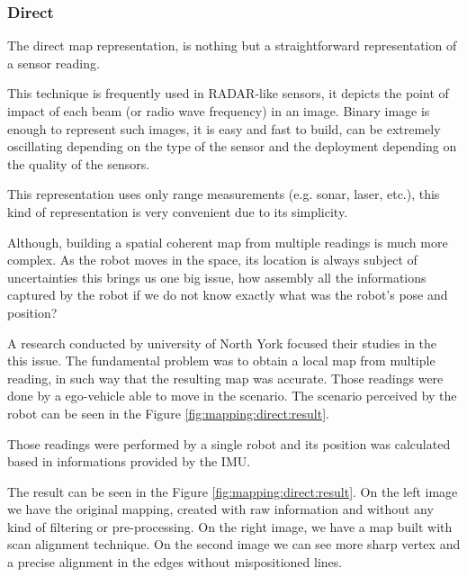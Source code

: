 \subsubsection{Direct}

The direct map representation, is nothing but a straightforward representation of a sensor reading. 

This technique is frequently used in RADAR-like sensors, it depicts the point of impact of each beam (or radio wave frequency) in an image. Binary image is enough to represent such images, it is easy and fast to build, can be extremely oscillating depending on the type of the sensor and the deployment depending on the quality of the sensors.

This representation uses only range measurements (e.g. sonar, laser, etc.), this kind of representation is very convenient due to its simplicity. 

Although, building a spatial coherent map from multiple readings is much more complex. As the robot moves in the space, its location is always subject of uncertainties this brings us one big issue, how assembly all the informations captured by the robot if we do not know exactly what was the robot's pose and position? 

A research conducted by university of North York\cite{Lu:1997:GCR:591441.591464} focused their studies in the this issue. The fundamental problem was to obtain a local map from multiple reading, in such way that the resulting map was accurate. Those readings were done by a ego-vehicle able to move in the scenario. The scenario perceived by the robot can be seen in the Figure \ref{fig:mapping:direct:result}.

Those readings were performed by a single robot and its position was calculated based in informations provided by the IMU.

The result can be seen in the Figure \ref{fig:mapping:direct:result}. On the left image we have the original mapping, created with raw information and without any kind of filtering or pre-processing. On the right image, we have a map built with scan alignment technique\cite{Lu:1997:GCR:591441.591464}. On the second image we can see more sharp vertex and a precise alignment in the edges without mispositioned lines.

